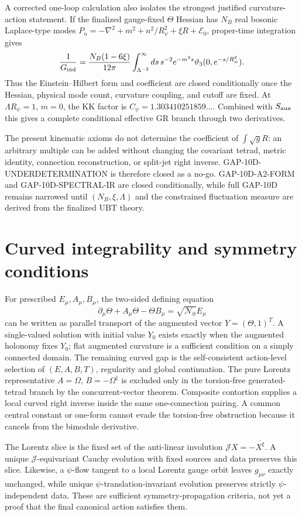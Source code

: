 \documentclass[11pt,a4paper]{article}
\begin{document}
A corrected one-loop calculation also isolates the strongest justified
curvature-action statement.  If the finalized gauge-fixed $\Theta$ Hessian has
$N_B$ real bosonic Laplace-type modes
$P_n=-\nabla^2+m^2+n^2/R_\psi^2+\xi R+\mathcal E_0$, proper-time integration
gives
\[
 \frac1{G_{\rm ind}}=\frac{N_B(1-6\xi)}{12\pi}
 \int_{\Lambda^{-2}}^\infty ds\,s^{-2}e^{-m^2s}
 \vartheta_3(0,e^{-s/R_\psi^2}).
\]
Thus the Einstein--Hilbert form and coefficient are closed conditionally once
the Hessian, physical mode count, curvature coupling, and cutoff are fixed.
At $\Lambda R_\psi=1$, $m=0$, the KK factor is
$C_\psi=1.303410251859\ldots$.  Combined with $S_{\rm aux}$ this gives a
complete conditional effective GR branch through two derivatives.

The present kinematic axioms do not determine the coefficient of
$\int\sqrt gR$: an arbitrary multiple can be added without changing the
covariant tetrad, metric identity, connection reconstruction, or split-jet
right inverse.  GAP-10D-UNDERDETERMINATION is therefore closed as a no-go.
GAP-10D-A2-FORM and GAP-10D-SPECTRAL-IR are closed conditionally, while full
GAP-10D remains narrowed until $(N_B,\xi,\Lambda)$ and the constrained
fluctuation measure are derived from the finalized UBT theory.

\section{Curved integrability and symmetry conditions}
For prescribed $E_\mu,A_\mu,B_\mu$, the two-sided defining equation
\[
 \partial_\mu\Theta+A_\mu\Theta-\Theta B_\mu
 =\sqrt{\mathcal N_0}E_\mu
\]
can be written as parallel transport of the augmented vector
$Y=(\Theta,1)^T$.  A single-valued solution with initial value $Y_0$ exists
exactly when the augmented holonomy fixes $Y_0$; flat augmented curvature is a
sufficient condition on a simply connected domain.  The remaining curved gap is the self-consistent action-level
selection of $(E,A,B,T)$, regularity and global continuation.  The pure
Lorentz representative $A=\Omega$, $B=-\Omega^\ddagger$ is excluded only in
the torsion-free generated-tetrad branch by the concurrent-vector theorem.
Composite contortion supplies a local curved right inverse inside the same
one-connection pairing.  A common central constant or one-form cannot evade
the torsion-free obstruction because it cancels from the bimodule derivative.

The Lorentz slice is the fixed set of the anti-linear involution
$\mathcal JX=-\overline{X^\sharp}$.  A unique $\mathcal J$-equivariant Cauchy
evolution with fixed sources and data preserves this slice.  Likewise, a
$\psi$-flow tangent to a local Lorentz gauge orbit leaves $g_{\mu\nu}$ exactly
unchanged, while unique $\psi$-translation-invariant evolution preserves
strictly $\psi$-independent data.  These are sufficient symmetry-propagation
criteria, not yet a proof that the final canonical action satisfies them.
\end{document}
